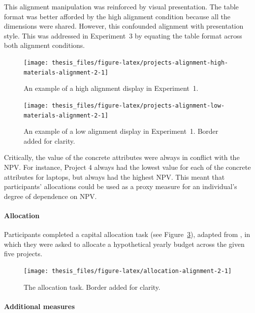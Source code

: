 \documentclass[a4paper, nobind, dvipsnames]{templates/ociamthesis}
\theoremstyle{definition}
\theoremstyle{definition}
\theoremstyle{definition}
\theoremstyle{definition}
\theoremstyle{remark}
\begin{document}
This alignment manipulation was reinforced by visual presentation. The table
format was better afforded by the high alignment condition because all the
dimensions were shared. However, this confounded alignment with presentation
style. This was addressed in Experiment~3 by equating the table format across
both alignment conditions.



\begin{figure}
\texttt{[image: thesis\_files/figure-latex/projects-alignment-high-materials-alignment-2-1]} \caption{An example of a high alignment display in Experiment~1.}\label{fig:projects-alignment-high-materials-alignment-2}
\end{figure}



\begin{figure}
\texttt{[image: thesis\_files/figure-latex/projects-alignment-low-materials-alignment-2-1]} \caption{An example of a low alignment display in Experiment~1. Border added for clarity.}\label{fig:projects-alignment-low-materials-alignment-2}
\end{figure}

Critically, the value of the concrete attributes were always in conflict with
the NPV. For instance, Project 4 always had the lowest value for each of the
concrete attributes for laptops, but always had the highest NPV. This meant that
participants' allocations could be used as a proxy measure for an individual's
degree of dependence on NPV.

\paragraph{Allocation}

Participants completed a capital allocation task (see
Figure~\ref{fig:allocation-alignment-2}), adapted from \textcite{bardolet2011}, in which
they were asked to allocate a hypothetical yearly budget across the given five
projects.



\begin{figure}
\texttt{[image: thesis\_files/figure-latex/allocation-alignment-2-1]} \caption{The allocation task. Border added for clarity.}\label{fig:allocation-alignment-2}
\end{figure}

\paragraph{Additional measures}
\end{document}
